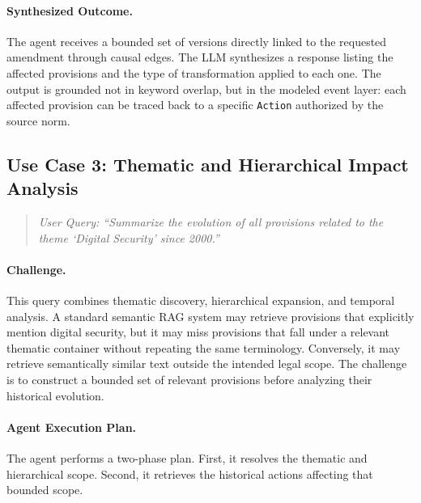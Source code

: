 \documentclass[11pt]{article}
\begin{document}
\paragraph{Synthesized Outcome.}
The agent receives a bounded set of versions directly linked to the requested amendment through causal edges. The LLM synthesizes a response listing the affected provisions and the type of transformation applied to each one. The output is grounded not in keyword overlap, but in the modeled event layer: each affected provision can be traced back to a specific \texttt{Action} authorized by the source norm.

\subsection{Use Case 3: Thematic and Hierarchical Impact Analysis}

\begin{quote}
\textit{User Query: ``Summarize the evolution of all provisions related to the theme `Digital Security' since 2000.''}
\end{quote}

\paragraph{Challenge.}
This query combines thematic discovery, hierarchical expansion, and temporal analysis. A standard semantic RAG system may retrieve provisions that explicitly mention digital security, but it may miss provisions that fall under a relevant thematic container without repeating the same terminology. Conversely, it may retrieve semantically similar text outside the intended legal scope. The challenge is to construct a bounded set of relevant provisions before analyzing their historical evolution.

\paragraph{Agent Execution Plan.}
The agent performs a two-phase plan. First, it resolves the thematic and hierarchical scope. Second, it retrieves the historical actions affecting that bounded scope.
\end{document}
